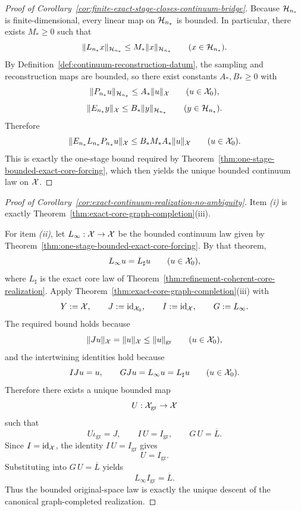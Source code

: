 \begin{proof}[Proof of Corollary~\ref{cor:finite-exact-stage-closes-continuum-bridge}]
\label{proof:cor:finite-exact-stage-closes-continuum-bridge}
Because \(\mathcal{H}_{n_\ast}\) is finite-dimensional, every linear map on
\(\mathcal{H}_{n_\ast}\) is bounded. In particular, there exists \(M_\ast\ge 0\) such
that
\[
\|L_{n_\ast}x\|_{\mathcal{H}_{n_\ast}}\le M_\ast\|x\|_{\mathcal{H}_{n_\ast}}
\qquad (x\in\mathcal{H}_{n_\ast}).
\]
By Definition~\ref{def:continuum-reconstruction-datum}, the sampling and
reconstruction maps are bounded, so there exist constants \(A_\ast,B_\ast\ge0\)
with
\[
\|P_{n_\ast}u\|_{\mathcal{H}_{n_\ast}}\le A_\ast\|u\|_{\mathcal{X}}
\qquad (u\in\mathcal{X}_0),
\]
\[
\|E_{n_\ast}y\|_{\mathcal{X}}\le B_\ast\|y\|_{\mathcal{H}_{n_\ast}}
\qquad (y\in\mathcal{H}_{n_\ast}).
\]
Therefore
\[
\|E_{n_\ast}L_{n_\ast}P_{n_\ast}u\|_{\mathcal{X}}
\le
B_\ast M_\ast A_\ast \|u\|_{\mathcal{X}}
\qquad (u\in\mathcal{X}_0).
\]
This is exactly the one-stage bound required by
Theorem~\ref{thm:one-stage-bounded-exact-core-forcing}, which then yields the
unique bounded continuum law on \(\mathcal{X}\).
\end{proof}

\begin{proof}[Proof of Corollary~\ref{cor:exact-continuum-realization-no-ambiguity}]
\label{proof:cor:exact-continuum-realization-no-ambiguity}
Item \emph{(i)} is exactly
Theorem~\ref{thm:exact-core-graph-completion}(iii).

For item \emph{(ii)}, let \(L_\infty:\mathcal{X}\to\mathcal{X}\) be the bounded continuum law
given by Theorem~\ref{thm:one-stage-bounded-exact-core-forcing}. By that
theorem,
\[
L_\infty u=L_\sharp u
\qquad (u\in\mathcal{X}_0),
\]
where \(L_\sharp\) is the exact core law of
Theorem~\ref{thm:refinement-coherent-core-realization}. Apply
Theorem~\ref{thm:exact-core-graph-completion}(iii) with
\[
Y:=\mathcal{X},
\qquad
J:=\mathrm{id}_{\mathcal{X}_0},
\qquad
I:=\mathrm{id}_{\mathcal{X}},
\qquad
G:=L_\infty.
\]
The required bound holds because
\[
\|Ju\|_{\mathcal{X}}=\|u\|_{\mathcal{X}}\le \|u\|_{\mathrm{gr}}
\qquad (u\in\mathcal{X}_0),
\]
and the intertwining identities hold because
\[
IJu=u,
\qquad
GJu=L_\infty u=L_\sharp u
\qquad (u\in\mathcal{X}_0).
\]
Therefore there exists a unique bounded map
\[
U:\mathcal{X}_{\mathrm{gr}}\to\mathcal{X}
\]
such that
\[
U\iota_{\mathrm{gr}}=J,
\qquad
I\,U=I_{\mathrm{gr}},
\qquad
G\,U=\overline L.
\]
Since \(I=\mathrm{id}_{\mathcal{X}}\), the identity \(I\,U=I_{\mathrm{gr}}\) gives
\[
U=I_{\mathrm{gr}}.
\]
Substituting into \(G\,U=\overline L\) yields
\[
L_\infty I_{\mathrm{gr}}=\overline L.
\]
Thus the bounded original-space law is exactly the unique descent of the
canonical graph-completed realization.
\end{proof}

